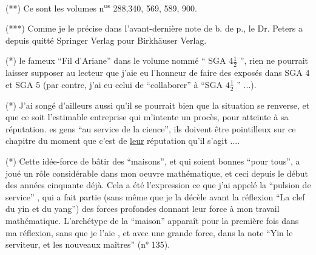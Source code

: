 (**\deleted{*}) Ce sont les volumes n\textsuperscript{os} 288,340, 569, 589, 900.

(***\deleted{*}) Comme je le précise dans l'avant-dernière note de b. de p., le Dr. Peters a depuis quitté Springer Verlag pour Birkhäuser Verlag.

(*)   le fameux ``Fil d'Ariane''  dans le volume nommé `` SGA $4\frac12$ '',  rien ne pourrait laisser supposer au lecteur que j'aie eu l'honneur de faire des exposés dans SGA 4 et SGA 5 (par contre, j'ai eu celui de ``collaborer'' à ``SGA $4\frac12$ '' ...).

(*) J'ai songé d'ailleurs aussi qu'il se pourrait bien que la situation se renverse, et que ce soit l'estimable entreprise qui m'intente un procès, pour atteinte à sa réputation.  es gens ``au service de la cience'', ils doivent être pointilleux sur ce chapitre \deleted{\unsure{--}} \inserted{(}du moment que c'est de \uline{leur}  réputation qu'il s'agit ...\inserted{)}.

(*) Cette idée-force de bâtir des ``maisons'', et qui soient bonnes ``pour tous'', a joué un rôle considérable dans mon oeuvre mathématique, et ceci depuis le début des années cinquante déjà. Cela a été l'expression   ce que j'ai appelé la ``pulsion de service'' , qui a fait partie (sans même que je la décèle avant la réflexion ``La clef du yin et du yang'') des  forces profondes donnant leur force  à mon travail mathématique. L'archétype de la ``maison'' apparaît pour la première fois dans ma réflexion,  sans que je l'aie  , et avec une grande force, dans la note ``Yin le serviteur, et les nouveaux maîtres'' (n° 135).


